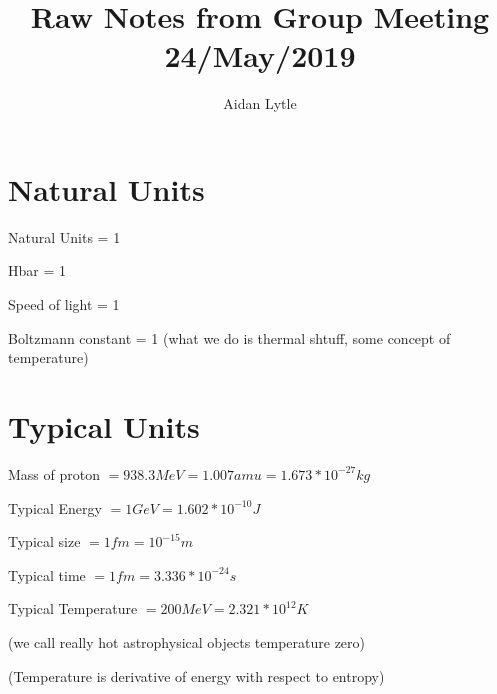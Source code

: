 \documentclass{article}
\begin{document}
\title{Raw Notes from Group Meeting 24/May/2019}
\author{Aidan Lytle}

\maketitle

\section{Natural Units}
\vspace{10 mm}

Natural Units = 1

Hbar = 1

Speed of light = 1

Boltzmann constant = 1 (what we do is thermal shtuff, some concept of temperature)

\section{Typical Units}
Mass of proton \(= 938.3 MeV = 1.007 amu = 1.673* 10^{-27} kg\)

Typical Energy \(= 1 GeV = 1.602 * 10^{-10} J\)

Typical size \(= 1 fm = 10^{-15} m\)

Typical time \(= 1 fm = 3.336 * 10^{-24} s\)

Typical Temperature \(= 200 MeV = 2.321 * 10^{12} K\)

(we call really hot astrophysical objects temperature zero)

(Temperature is derivative of energy with respect to entropy)
\end{document}
